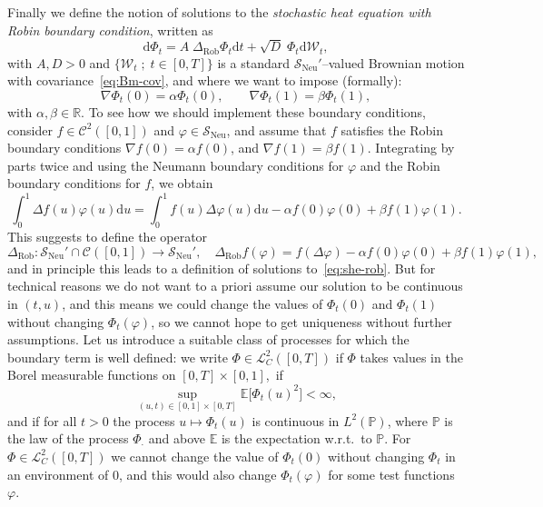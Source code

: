 \documentclass[10pt]{amsart}
\theoremstyle{definition}\newtheorem{defi}[theo]{Definition}\newtheorem{rema}[theo]{Remark}\newtheorem{exam}[theo]{Example}\newtheorem{exem}[theo]{Example}\newtheorem{nota}[theo]{Notation}
\DeclareMathOperator{\Neu}{Neu}
\DeclareMathOperator{\Rob}{Rob}
\newcommand{\bb}[1]{{\mathbb #1}}
\newcommand{\RR}{\mathbb R}
\newcommand{\mc}[1]{{\mathcal #1}}
\renewcommand{\mc}[1]{{\mathcal #1}}
\newcommand{\SN}{\ensuremath{\mc S_{\Neu}}}
\newcommand*{\dd}{\mathrm{d}}
\newcommand*{\dt}{\dd t}
\newcommand*{\du}{\dd u}
\begin{document}
Finally we define the notion of solutions to the \emph{stochastic heat equation with Robin boundary condition}, written as
\begin{equation}\label{eq:she-rob}
\dd \Phi_t = A\; \Delta_{\mathrm{Rob}} \Phi_t \dt + \sqrt{D}\; \Phi_t \dd\mc W_t,
\end{equation}
with $A, D>0$ and $\{\mc W_t\; ; \; t\in[0,T]\}$ is a standard $\SN'$--valued Brownian motion with covariance~\eqref{eq:Bm-cov}, and where we want to impose (formally):
\begin{equation}\label{eq:BC-rob}
\nabla \Phi_t(0) = \alpha \Phi_t(0), \qquad \nabla \Phi_t(1) = \beta \Phi_t(1),
\end{equation}
with $\alpha, \beta \in \RR$. To see how we should implement these boundary conditions, consider $f \in \mc C^2([0,1])$ and $\varphi \in \SN$, and assume that $f$ satisfies the Robin boundary conditions $\nabla f(0) = \alpha f(0)$, and $\nabla f(1) = \beta f(1)$. Integrating by parts twice and using the Neumann boundary conditions for $\varphi$ and the Robin boundary conditions for $f$, we obtain
\[
\int_0^1 \Delta f(u) \varphi(u) \du = \int_0^1 f(u) \Delta \varphi(u) \du - \alpha f(0) \varphi(0) + \beta f(1) \varphi(1).
\]
This suggests to define the operator
\[
\Delta_{\Rob} \colon \SN'\cap\mc C([0,1]) \to \SN',\quad \Delta_{\Rob} f(\varphi) = f(\Delta \varphi) - \alpha f(0) \varphi(0) + \beta f(1) \varphi(1),
\]
and in principle this leads to a definition of solutions to~\eqref{eq:she-rob}. But for technical reasons we do not want to a priori assume our solution to be continuous in $(t,u)$, and this means we could change the values of $\Phi_t(0)$ and $\Phi_t(1)$ without changing $\Phi_t(\varphi)$, so we cannot hope to get uniqueness without further assumptions. Let us introduce a suitable class of processes for which the boundary term is well defined: we write $\Phi \in \mc L^2_C([0,T])$ if $\Phi$ takes values in the Borel measurable functions on $[0,T] \times [0,1]$,~if
\[
\sup_{(u,t) \in [0,1] \times [0,T]} \bb E\big[\Phi_t(u)^2\big] < \infty,
\]
and if for all $t > 0$ the process $u \mapsto \Phi_t(u)$ is continuous in $L^2(\bb P)$, where $\bb P$ is the law of the process $\Phi_\cdot$ and above $\bb E$ is the expectation w.r.t.~to $\bb P$. For $\Phi \in \mc L^2_C([0,T])$ we cannot change the value of $\Phi_t(0)$ without changing $\Phi_t$ in an environment of $0$, and this would also change $\Phi_t(\varphi)$ for some test functions $\varphi$.
\end{document}
